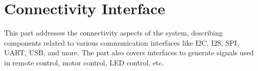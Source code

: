 \documentclass[openany, 10pt]{book}
\begin{document}








\part{Connectivity Interface}


This part addresses the connectivity aspects of the system, describing components related to various communication interfaces like I2C, I2S, SPI, UART, USB, and more. The part also covers interfaces to generate signals used in remote control, motor control, LED control, etc.

\end{document}

